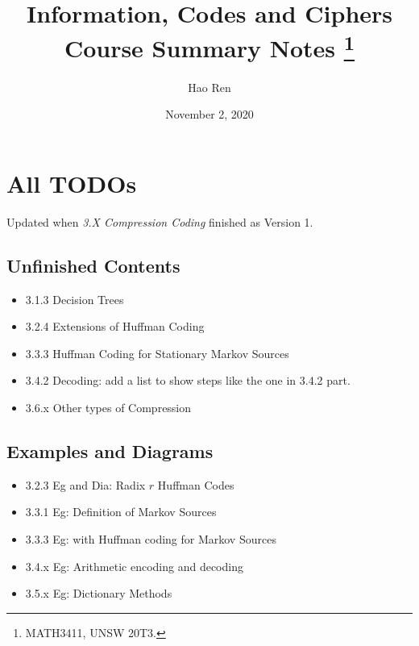 \documentclass{article}
\begin{document}
\title{Information, Codes and Ciphers \\
       \vspace{.625em} Course Summary Notes \footnote{MATH3411, UNSW 20T3.}}
\author{Hao Ren}
\date{November 2, 2020}
\maketitle

\newpage

\tableofcontents

\newpage

\setcounter{section}{-1}

\section{All TODOs}

Updated when \emph{3.X Compression Coding} finished as Version 1.

\subsection{Unfinished Contents}

\begin{itemize}
    \item 3.1.3 Decision Trees
    \item 3.2.4 Extensions of Huffman Coding
    \item 3.3.3 Huffman Coding for Stationary Markov Sources
    \item 3.4.2 Decoding: add a list to show steps like the one in 3.4.2 part.
    \item 3.6.x Other types of Compression
\end{itemize}

\subsection{Examples and Diagrams}

\begin{itemize}
    \item 3.2.3 Eg and Dia: Radix $r$ Huffman Codes
    \item 3.3.1 Eg: Definition of Markov Sources
    \item 3.3.3 Eg: with Huffman coding for Markov Sources
    \item 3.4.x Eg: Arithmetic encoding and decoding
    \item 3.5.x Eg: Dictionary Methods
\end{itemize}
\end{document}
